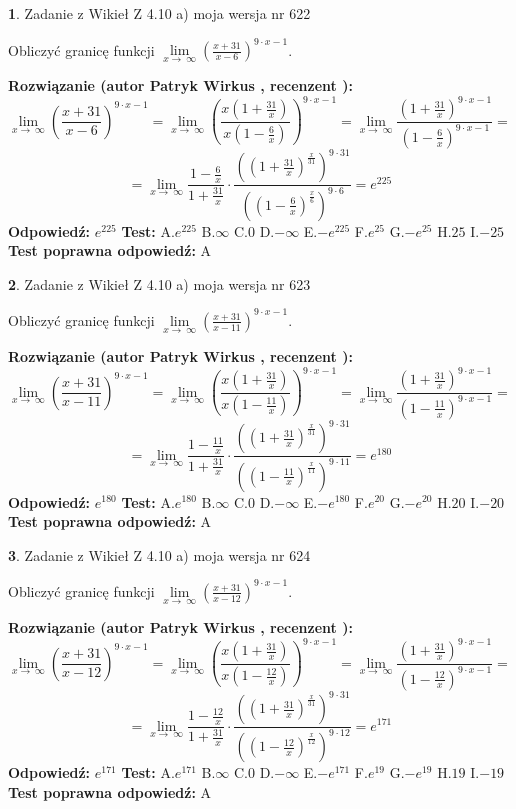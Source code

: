 \documentclass[12pt, a4paper]{article}
\theoremstyle{definition} %
\newtheorem{zad}{}
\newcommand{\zadStart}[1]{\begin{zad}#1\newline}
\newcommand{\zadStop}{\end{zad}}
\newcommand{\rozwStart}[2]{\noindent \textbf{Rozwiązanie (autor #1 , recenzent #2): }\newline}
\newcommand{\rozwStop}{\newline}
\newcommand{\odpStart}{\noindent \textbf{Odpowiedź:}\newline}
\newcommand{\odpStop}{\newline}
\newcommand{\testStart}{\noindent \textbf{Test:}\newline}
\newcommand{\testStop}{\newline}
\newcommand{\kluczStart}{\noindent \textbf{Test poprawna odpowiedź:}\newline}
\newcommand{\kluczStop}{\newline}
\begin{document}
\zadStart{Zadanie z Wikieł Z 4.10 a) moja wersja nr 622}

Obliczyć granicę funkcji  $\lim\limits_{x\to\ \infty}(\frac{x+31}{x-6})^{9\cdot x-1}$.
\zadStop
\rozwStart{Patryk Wirkus}{}
$$\lim\limits_{x\to\ \infty}(\frac{x+31}{x-6})^{9\cdot x-1} = \lim\limits_{x\to\ \infty}(\frac{x(1+\frac{31}{x})}{x(1-\frac{6}{x})})^{9\cdot x-1}=\lim\limits_{x\to\ \infty}\frac{(1+\frac{31}{x})^{9\cdot x-1}}{(1-\frac{6}{x})^{9\cdot x-1}}=$$
$$=\lim\limits_{x\to\ \infty}\frac{1-\frac{6}{x}}{1+\frac{31}{x}}\cdot\frac{((1+\frac{31}{x})^{\frac{x}{31}})^{9\cdot31}}{((1-\frac{6}{x})^{\frac{x}{6}})^{9\cdot6}}=e^{225}$$
\rozwStop
\odpStart
$e^{225}$
\odpStop
\testStart
A.$e^{225}$ B.$\infty$ C.$0$ D.$-\infty$ E.$-e^{225}$
F.$e^{25}$ G.$-e^{25}$
H.$25$
I.$-25$
\testStop
\kluczStart
A
\kluczStop



\zadStart{Zadanie z Wikieł Z 4.10 a) moja wersja nr 623}

Obliczyć granicę funkcji  $\lim\limits_{x\to\ \infty}(\frac{x+31}{x-11})^{9\cdot x-1}$.
\zadStop
\rozwStart{Patryk Wirkus}{}
$$\lim\limits_{x\to\ \infty}(\frac{x+31}{x-11})^{9\cdot x-1} = \lim\limits_{x\to\ \infty}(\frac{x(1+\frac{31}{x})}{x(1-\frac{11}{x})})^{9\cdot x-1}=\lim\limits_{x\to\ \infty}\frac{(1+\frac{31}{x})^{9\cdot x-1}}{(1-\frac{11}{x})^{9\cdot x-1}}=$$
$$=\lim\limits_{x\to\ \infty}\frac{1-\frac{11}{x}}{1+\frac{31}{x}}\cdot\frac{((1+\frac{31}{x})^{\frac{x}{31}})^{9\cdot31}}{((1-\frac{11}{x})^{\frac{x}{11}})^{9\cdot11}}=e^{180}$$
\rozwStop
\odpStart
$e^{180}$
\odpStop
\testStart
A.$e^{180}$ B.$\infty$ C.$0$ D.$-\infty$ E.$-e^{180}$
F.$e^{20}$ G.$-e^{20}$
H.$20$
I.$-20$
\testStop
\kluczStart
A
\kluczStop



\zadStart{Zadanie z Wikieł Z 4.10 a) moja wersja nr 624}

Obliczyć granicę funkcji  $\lim\limits_{x\to\ \infty}(\frac{x+31}{x-12})^{9\cdot x-1}$.
\zadStop
\rozwStart{Patryk Wirkus}{}
$$\lim\limits_{x\to\ \infty}(\frac{x+31}{x-12})^{9\cdot x-1} = \lim\limits_{x\to\ \infty}(\frac{x(1+\frac{31}{x})}{x(1-\frac{12}{x})})^{9\cdot x-1}=\lim\limits_{x\to\ \infty}\frac{(1+\frac{31}{x})^{9\cdot x-1}}{(1-\frac{12}{x})^{9\cdot x-1}}=$$
$$=\lim\limits_{x\to\ \infty}\frac{1-\frac{12}{x}}{1+\frac{31}{x}}\cdot\frac{((1+\frac{31}{x})^{\frac{x}{31}})^{9\cdot31}}{((1-\frac{12}{x})^{\frac{x}{12}})^{9\cdot12}}=e^{171}$$
\rozwStop
\odpStart
$e^{171}$
\odpStop
\testStart
A.$e^{171}$ B.$\infty$ C.$0$ D.$-\infty$ E.$-e^{171}$
F.$e^{19}$ G.$-e^{19}$
H.$19$
I.$-19$
\testStop
\kluczStart
A
\kluczStop
\end{document}
